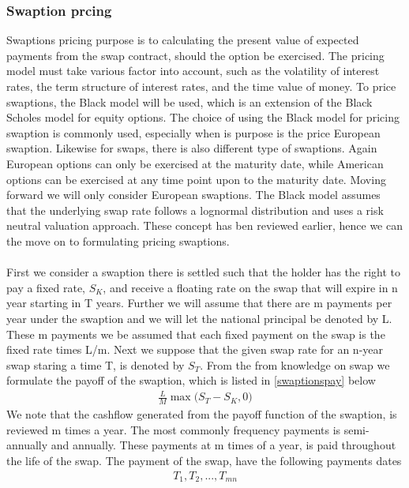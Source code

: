 \subsubsection{Swaption prcing}
Swaptions pricing purpose is to calculating the present value of expected payments from the swap contract,
should the option be exercised. The pricing model must take various factor into account, such as the
volatility of interest rates, the term structure of interest rates, and the time value of money. 
To price swaptions, the Black model will be used, which is an extension of the Black Scholes
model for equity options. The choice of using the Black model for pricing swaption is commonly used, especially when
is purpose is the price European swaption. Likewise for swaps, there is also different type of swaptions. 
Again European options can only be exercised at the maturity date, while American options can be exercised
at any time point upon to the maturity date. Moving forward we will only consider European swaptions. 
The Black model assumes that the underlying swap rate follows a lognormal distribution and uses a 
risk neutral valuation approach. These concept has ben reviewed earlier, hence we can the move on to 
formulating pricing swaptions.
\\\\
First we consider a swaption there is settled such that the holder has the right to pay a fixed rate, $S_K$, 
and receive a floating rate on the swap that will expire in n year starting in T years.
Further we will assume that there are m payments 
per year under the swaption and we will let  the national principal be denoted by L. These m payments we 
be assumed that each fixed payment on the swap is the fixed rate times L/m. Next we suppose that 
the given swap rate for an n-year swap staring a time T, is denoted by $S_T$. 
From the from knowledge on swap we formulate the payoff of the swaption, which is listed in
\autoref{swaptionspay} below
\begin{align}
    \frac{L}{M} \max \Big( S_T - S_K, 0 \Big)
    \label{swaptionspay}
\end{align}
We note that the cashflow generated from the payoff function of the swaption, is reviewed m times 
a year. The most commonly frequency payments is semi-annually and annually. These payments at m times
of a year, is paid throughout the life of the swap. The payment of the swap, have the following 
payments dates 
\begin{align*}
    T_1,T_2,...,T_{mn}
\end{align*}
